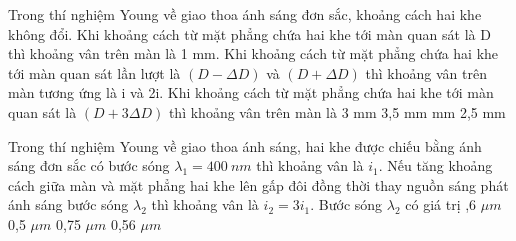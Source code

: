 \begin{vidu}%
 Trong thí nghiệm Young về giao thoa ánh sáng đơn sắc, khoảng cách hai khe không đổi. Khi khoảng cách từ mặt phẳng chứa hai khe tới màn quan sát là D thì khoảng vân trên màn là 1 mm. Khi khoảng cách từ mặt phẳng chứa hai khe tới màn quan sát lần lượt là $(D -\Delta D)$ và $(D +\Delta D)$ thì khoảng vân trên màn tương ứng là i và 2i. Khi khoảng cách từ mặt phẳng chứa hai khe tới màn quan sát là $(D + 3\Delta D)$ thì khoảng vân trên màn là
\choice
{3 mm}
{3,5 mm}
{ mm}
{2,5 mm}
\end{vidu} %
\begin{vidu}%
Trong thí nghiệm Young về giao thoa ánh sáng, hai khe được chiếu bằng ánh sáng đơn sắc có bước sóng ${{\lambda}_{1}}=400\ nm $ thì khoảng vân là ${i_1} $. Nếu tăng khoảng cách giữa màn và mặt phẳng hai khe lên gấp đôi đồng thời thay nguồn sáng phát ánh sáng bước sóng ${{\lambda}_{2}} $ thì khoảng vân là ${i_2}=3{i_1} $. Bước sóng ${{\lambda}_{2}} $ có giá trị
\choice
{,6 $\mu m $}
{0,5 $\mu m $}
{0,75 $\mu m $}
{0,56 $\mu m $}
\end{vidu} %
